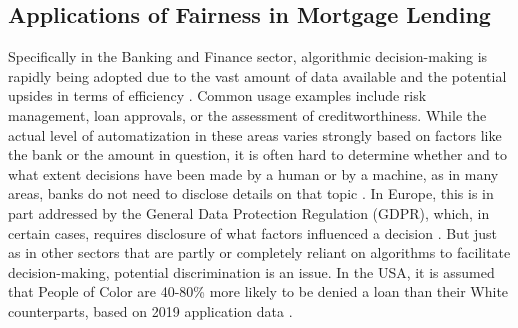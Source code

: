 

\subsection{Applications of Fairness in Mortgage Lending}\label{subsec:mortgage_lending_fairness}

Specifically in the Banking and Finance sector, algorithmic decision-making is rapidly being adopted due to the vast amount of data available and the potential upsides in terms of efficiency \parencite{Holli2022}.
Common usage examples include risk management, loan approvals, or the assessment of creditworthiness. While the actual level of automatization in these areas varies strongly based on factors like the bank or the amount in question, it is often hard to determine whether and to what extent decisions have been made by a human or by a machine, as in many areas, banks do not need to disclose details on that topic \parencite{Bafin2023}.
In Europe, this is in part addressed by the General Data Protection Regulation (GDPR), which, in certain cases, requires disclosure of what factors influenced a decision \parencite{GDPR}.
But just as in other sectors that are partly or completely reliant on algorithms to facilitate decision-making, potential discrimination is an issue.  In the USA, it is assumed that People of Color are 40-80\% more likely to be denied a loan than their White counterparts, based on 2019 application data \parencite{Martinez2021}.

